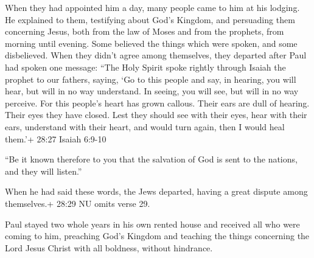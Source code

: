  When they had appointed him a day, many people came to him
at his lodging. He explained to them, testifying about God's Kingdom,
and persuading them concerning Jesus, both from the law of Moses and
from the prophets, from morning until evening.  Some
believed the things which were spoken, and some disbelieved.
 When they didn't agree among themselves, they departed
after Paul had spoken one message: ``The Holy Spirit spoke rightly
through Isaiah the prophet to our fathers,  saying, `Go to
this people and say, in hearing, you will hear, but will in no way
understand. In seeing, you will see, but will in no way perceive.
 For this people's heart has grown callous. Their ears are
dull of hearing. Their eyes they have closed. Lest they should see with
their eyes, hear with their ears, understand with their heart, and would
turn again, then I would heal them.'+ 28:27 Isaiah 6:9-10

 ``Be it known therefore to you that the salvation of God
is sent to the nations, and they will listen.''

 When he had said these words, the Jews departed, having a
great dispute among themselves.+ 28:29 NU omits verse 29.

 Paul stayed two whole years in his own rented house and
received all who were coming to him,  preaching God's
Kingdom and teaching the things concerning the Lord Jesus Christ with
all boldness, without hindrance.
